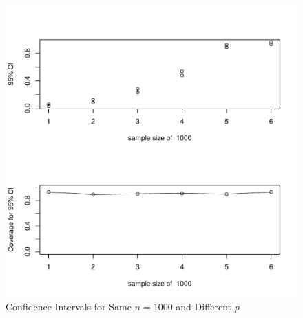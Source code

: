 \documentclass[12pt,letterpaper,titlepage,en-US]{article}
\begin{document}
\begin{figure}[H]
    \caption{Confidence Intervals for Same $n = 1000$ and Different $p$}
    \label{sndp}
    \centering

    \includegraphics[width=.9\textwidth]{figure/sameN1000.pdf}

\end{figure}
\end{document}
